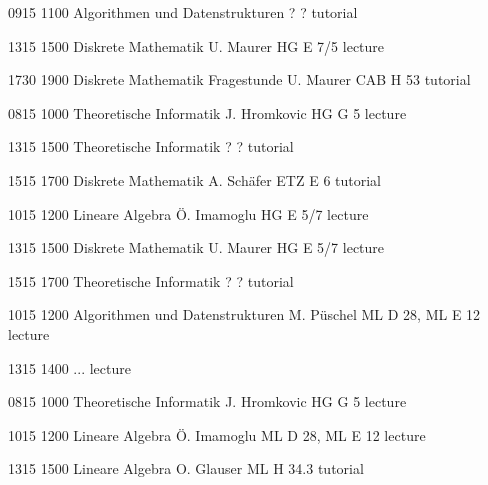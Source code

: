 \documentclass[a4paper, landscape]{article}
\begin{document}
\begin{timetable}


   {0915} {1100}
  {Algorithmen und Datenstrukturen}
  {?}
  {?}
  {tutorial}

   {1315} {1500}
  {Diskrete Mathematik}
  {U. Maurer}
  {HG E 7/5}
  {lecture}

   {1730} {1900}
  {Diskrete Mathematik Fragestunde}
  {U. Maurer}
  {CAB H 53}
  {tutorial}


   {0815} {1000}
  {Theoretische Informatik}
  {J. Hromkovic}
  {HG G 5}
  {lecture}

   {1315} {1500}
  {Theoretische Informatik}
  {?}
  {?}
  {tutorial}

   {1515} {1700}
  {Diskrete Mathematik}
  {A. Schäfer}
  {ETZ E 6}
  {tutorial}


   {1015} {1200}
  {Lineare Algebra}
  {Ö. Imamoglu}
  {HG E 5/7}
  {lecture}

   {1315} {1500}
  {Diskrete Mathematik}
  {U. Maurer}
  {HG E 5/7}
  {lecture}

   {1515} {1700}
  {Theoretische Informatik}
  {?}
  {?}
  {tutorial}


   {1015} {1200}
  {Algorithmen und Datenstrukturen}
  {M. Püschel}
  {ML D 28, ML E 12}
  {lecture}

   {1315} {1400}
  {...}
  {}
  {}
  {lecture}


   {0815} {1000}
  {Theoretische Informatik}
  {J. Hromkovic}
  {HG G 5}
  {lecture}

   {1015} {1200}
  {Lineare Algebra}
  {Ö. Imamoglu}
  {ML D 28, ML E 12}
  {lecture}

   {1315} {1500}
  {Lineare Algebra}
  {O. Glauser}
  {ML H 34.3}
  {tutorial}

\end{timetable}
\end{document}
